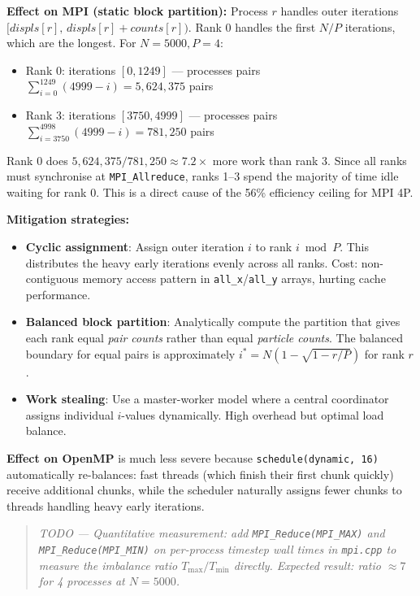 ﻿\documentclass[12pt,a4paper]{article}
\begin{document}
\textbf{Effect on MPI (static block partition):}
Process $r$ handles outer iterations $[\textit{displs}[r], \,
\textit{displs}[r] + \textit{counts}[r])$. Rank 0 handles the first
$N/P$ iterations, which are the longest. For $N=5000, P=4$:
\begin{itemize}
    \item Rank 0: iterations $[0, 1249]$ --- processes pairs
          $\sum_{i=0}^{1249}(4999-i) = 5{,}624{,}375$ pairs
    \item Rank 3: iterations $[3750, 4999]$ --- processes pairs
          $\sum_{i=3750}^{4998}(4999-i) = 781{,}250$ pairs
\end{itemize}

Rank 0 does $5{,}624{,}375 / 781{,}250 \approx 7.2\times$ more work
than rank 3. Since all ranks must synchronise at \texttt{MPI\_Allreduce},
ranks 1--3 spend the majority of time idle waiting for rank 0. This is
a direct cause of the 56\% efficiency ceiling for MPI 4P.

\textbf{Mitigation strategies:}
\begin{itemize}
    \item \textbf{Cyclic assignment}: Assign outer iteration $i$ to rank
          $i \bmod P$. This distributes the heavy early iterations evenly
          across all ranks. Cost: non-contiguous memory access pattern in
          \texttt{all\_x}/\texttt{all\_y} arrays, hurting cache performance.
    \item \textbf{Balanced block partition}: Analytically compute the
          partition that gives each rank equal \emph{pair counts} rather
          than equal \emph{particle counts}. The balanced boundary for equal
          pairs is approximately $i^* = N(1 - \sqrt{1 - r/P})$ for rank $r$.
    \item \textbf{Work stealing}: Use a master-worker model where a central
          coordinator assigns individual $i$-values dynamically. High
          overhead but optimal load balance.
\end{itemize}

\textbf{Effect on OpenMP} is much less severe because \texttt{schedule(dynamic,
16)} automatically re-balances: fast threads (which finish their first chunk
quickly) receive additional chunks, while the scheduler naturally assigns
fewer chunks to threads handling heavy early iterations.

\begin{quote}
\textit{TODO --- Quantitative measurement: add \texttt{MPI\_Reduce(MPI\_MAX)}
and \texttt{MPI\_Reduce(MPI\_MIN)} on per-process timestep wall times in
\texttt{mpi.cpp} to measure the imbalance ratio $T_{\max}/T_{\min}$ directly.
Expected result: ratio $\approx 7$ for 4 processes at $N=5000$.}
\end{quote}
\end{document}
